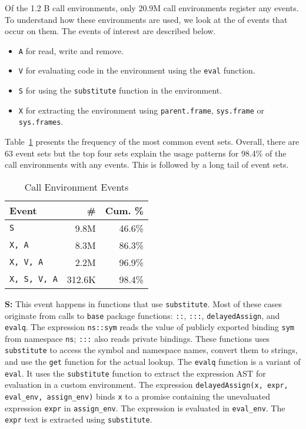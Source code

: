 \documentclass[10pt,review,sigplan,authorversion=true]{acmart}
\newcommand{\code}[1]{\lstinline |#1|\xspace}
\newcommand{\base}{\code{base}}
\newcommand{\eval}{\code{eval}}
\newcommand{\substitute}{\code{substitute}}
\begin{document}
Of the 1.2 B call environments, only 20.9M call environments register any
events. To understand how these environments are used, we look at the of events
that occur on them. The events of interest are described below.
\begin{itemize}
\item \texttt{A} for read, write and remove.
\item \texttt{V} for evaluating code in the environment using the \eval function.
\item \texttt{S} for using the \substitute function in the environment.
\item \texttt{X} for extracting the environment using \code{parent.frame},
  \code{sys.frame} or \code{sys.frames}.
\end{itemize}

Table~\ref{table:call_env_seq} presents the frequency of the most common event
sets. Overall, there are 63 event sets but the top four sets explain the
usage patterns for 98.4\% of the call environments with any events. This is
followed by a long tail of event sets.

\begin{table}[!h]
  \small
  \caption{Call Environment Events} \label{table:call_env_seq}
  \centering
  \begin{tabular}{lrr}
    \toprule
    \textbf{Event}&\textbf{\#}&\textbf{Cum. \%}\\
    \midrule
    \texttt{S}&9.8M&46.6\%\\
    \texttt{X, A}&8.3M&86.3\%\\
    \texttt{X, V, A}&2.2M&96.9\%\\
    \texttt{X, S, V, A}&312.6K&98.4\%\\
    \bottomrule
  \end{tabular}
\end{table}

\noindent
\textbf{S:} This event happens in functions that use \code{substitute}.
  Most of these cases originate from calls to \base package functions:
  \code{::}, \code{:::}, \code{delayedAssign}, and \code{evalq}. The expression
  \code{ns::sym} reads the value of publicly exported binding \code{sym} from
  namespace \code{ns}; \code{:::} also reads private bindings. These functions
  uses \substitute to access the symbol and namespace names, convert them to
  strings, and use the \code{get} function for the actual lookup. The
  \code{evalq} function is a variant of \eval. It uses the \substitute function
  to extract the expression AST for evaluation in a custom environment. The
  expression \code{delayedAssign(x, expr, eval_env, assign_env)} binds \code{x}
  to a promise containing the unevaluated expression \code{expr} in
  \code{assign_env}. The expression is evaluated in \code{eval_env}. The
  \code{expr} text is extracted using \code{substitute}.
\end{document}
